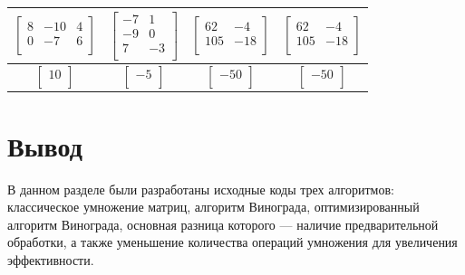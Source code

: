 \documentclass[12pt]{report}
\begin{document}
\begin{table}[h]
\begin{center}
\begin{tabular}{ | c | c | c | c |}
				$\begin{bmatrix} 
					8&-10&4 \\
					0&-7&6 \\ 
				\end{bmatrix}$ & 
				$\begin{bmatrix} 
					-7&1 \\
					-9&0 \\ 
					7&-3 \\ 
				\end{bmatrix}$ &
				$\begin{bmatrix} 
					62&-4 \\
					105&-18 \\  
				\end{bmatrix} $ &
				$\begin{bmatrix} 
					62&-4 \\
					105&-18 \\  
				\end{bmatrix} $ \\
				\hline
				
				$\begin{bmatrix} 
					10 \\ 
				\end{bmatrix}$ & 
				$\begin{bmatrix} 
					-5 \\ 
				\end{bmatrix}$ &
				$\begin{bmatrix} 
					-50 \\  
				\end{bmatrix} $ &
				$\begin{bmatrix} 
					-50 \\  
				\end{bmatrix} $ \\
				\hline
			\end{tabular}
		\end{center}
	\end{table} 

	\newpage
	
	\section{Вывод}
	В данном разделе были разработаны исходные коды трех алгоритмов: классическое умножение матриц, алгоритм Винограда, оптимизированный алгоритм Винограда, основная разница которого — наличие предварительной обработки, а также уменьшение количества операций умножения для увеличения эффективности.
	
\end{document}
